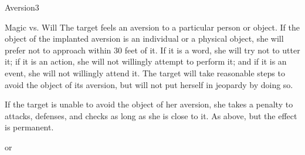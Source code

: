 \begin{spellsection}{Aversion}{3}
\begin{spellheader}
\end{spellheader}
\begin{spellcontent}
    \begin{spelltargetinginfo}
    \end{spelltargetinginfo}
    \begin{spelleffects}
        \begin{spellattack}{Magic vs. Will}
            \spellsuccess The target feels an aversion to a particular person or object. If the object of the implanted aversion is an individual or a physical object, she will prefer not to approach within 30 feet of it. If it is a word, she will try not to utter it; if it is an action, she will not willingly attempt to perform it; and if it is an event, she will not willingly attend it. The target will take reasonable steps to avoid the object of its aversion, but will not put herself in jeopardy by doing so.
            \par If the target is unable to avoid the object of her aversion, she takes a  penalty to attacks, defenses, and checks as long as she is close to it.
            \spellcritical As above, but the effect is permanent.
        \end{spellattack}
        \spelldur \durshort or \durperm
    \end{spelleffects}
\end{spellcontent}
\begin{spellfooter}
\end{spellfooter}

\begin{comment}
\subsubsection{B}
\end{comment}
\end{spellsection}

